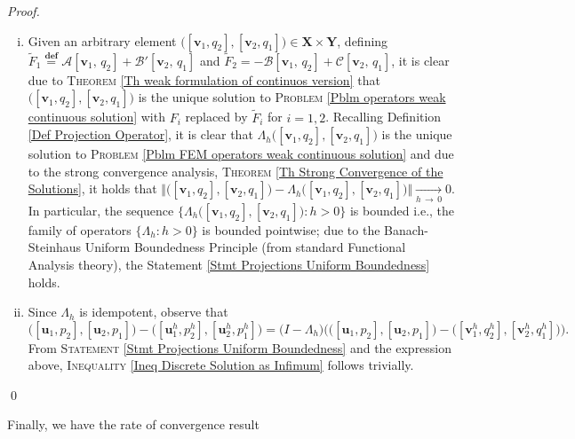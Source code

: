 \documentclass[3p]{elsarticle}
\def\A{{\mathcal A}}
\def\B{{\mathcal B}}
\def\C{{\mathcal C}}
\def\X{\mathbf X}
\def\Y{\mathbf Y}
\def\uone{\mathbf{u}_{1}}
\def\uoneh{\mathbf{u}_{1}^{h}}
\def\utwo{\mathbf{u}_{2}}
\def\utwoh{\mathbf{u}_{2}^{h}}
\def\vone{\mathbf{v}_{1}}
\def\voneh{\mathbf{v}_{1}^{h}}
\def\vtwo{\mathbf{v}_{2}}
\def\vtwoh{\mathbf{v}_{2}^{h}}
\def\qone{q_{1}}
\def\qoneh{q_{1}^{h}}
\def\qtwo{q_{2}}
\def\qtwoh{q_{2}^{h}}
\def\pone{p_{1}}
\def\poneh{p_{1}^{h}}
\def\ptwo{p_{2}}
\def\ptwoh{p_{2}^{h}}
\def\defining{\overset{\mathbf{def}} =}
\begin{document}
\begin{proof}
%
\begin{enumerate}[(i)]
\item Given an arbitrary element $ \big( [\vone, \qtwo], [\vtwo, \qone]\big) \in \X\times \Y $, defining $ \widetilde{F}_{1} \defining  \A[ \vone,\,\qtwo] + \B ' [ \vtwo,\, \qone] $ and $ \widetilde{F}_{2} = - \B [\vone,\,\qtwo]  + \C [\vtwo,\,\qone] $, it is clear due to \textsc{Theorem} \ref{Th weak formulation of continuos version} that $ \big( [\vone, \qtwo], [\vtwo, \qone]\big) $ is the unique solution to \textsc{Problem} \ref{Pblm operators weak continuous solution} with $ F_{i} $ replaced by $ \widetilde{F}_{i} $ for $ i = 1, 2 $. Recalling Definition \ref{Def Projection Operator}, it is clear that $ \Lambda_{h} \big( [\vone, \qtwo], [\vtwo, \qone]\big) $ is the unique solution to \textsc{Problem} \eqref{Pblm FEM operators weak continuous solution} and due to the strong convergence analysis, \textsc{Theorem} \ref{Th Strong Convergence of the Solutions}, it holds that $ \big\Vert \big( [\vone, \qtwo], [\vtwo, \qone]\big) - \Lambda_{h}\big( [\vone, \qtwo], [\vtwo, \qone]\big) \big\Vert \xrightarrow[h\,\rightarrow\, 0]{} 0 $. In particular, the sequence $ \big\{ \Lambda_{h}\big( [\vone, \qtwo], [\vtwo, \qone]\big) : h > 0 \big\} $ is bounded i.e., the family of operators $ \big\{ \Lambda_{h} : h > 0 \big\} $ is bounded pointwise; due to the Banach-Steinhaus Uniform Boundedness Principle (from standard Functional Analysis theory), the Statement \eqref{Stmt Projections Uniform Boundedness} holds.

\item Since $ \Lambda_{h} $ is idempotent, observe that 
%
\begin{equation*}
\big( [\uone, \ptwo], [\utwo, \pone]\big) 
- \big( [\uoneh, \ptwoh], [\utwoh, \poneh]\big) =
\big( I - \Lambda_{h} \big) 
\Big( 
\big( [\uone, \ptwo], [\utwo, \pone]\big) 
- \big( [\voneh, \qtwoh], [\vtwoh, \qoneh]\big)
\Big).
\end{equation*}
%
From \textsc{Statement} \ref{Stmt Projections Uniform Boundedness} and the expression above, \textsc{Inequality} \eqref{Ineq Discrete Solution as Infimum} follows trivially.
\end{enumerate}
%
\qed
\end{proof}
%
%
Finally, we have the rate of convergence result
%
%
\end{document}
